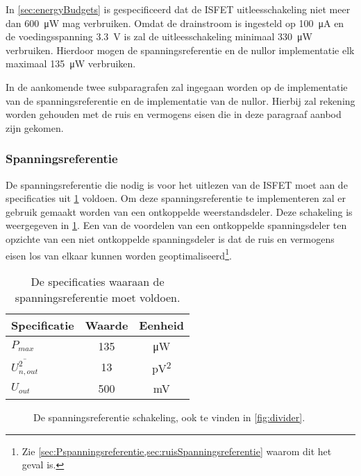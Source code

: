 In \cref{sec:energyBudgets} is gespecificeerd dat de ISFET uitleesschakeling niet meer dan \qty{600}{\micro\watt} mag verbruiken. Omdat de drainstroom is ingesteld op \qty{100}{\micro\ampere} en de voedingsspanning \qty{3.3}{\volt} is zal de uitleesschakeling minimaal \qty{330}{\micro\watt} verbruiken. Hierdoor mogen de spanningsreferentie en de nullor implementatie elk maximaal \qty{135}{\micro\watt} verbruiken.

In de aankomende twee subparagrafen zal ingegaan worden op de implementatie van de spanningsreferentie en de implementatie van de nullor. Hierbij zal rekening worden gehouden met de ruis en vermogens eisen die in deze paragraaf aanbod zijn gekomen.

\subsubsection{Spanningsreferentie}
De spanningsreferentie die nodig is voor het uitlezen van de ISFET moet aan de specificaties uit \cref{tab:specsSpanningsreferentie} voldoen. Om deze spanningsreferentie te implementeren zal er gebruik gemaakt worden van een ontkoppelde weerstandsdeler. Deze schakeling is weergegeven in \cref{fig:dividerForContext}. Een van de voordelen van een ontkoppelde spanningsdeler ten opzichte van een niet ontkoppelde spanningsdeler is dat de ruis en vermogens eisen los van elkaar kunnen worden geoptimaliseerd\footnote{Zie \cref{sec:Pspanningsreferentie,sec:ruisSpanningsreferentie} waarom dit het geval is.}.
\begin{table}[!htbp]
    \centering
    \begin{tabular}{l|c|c}
        Specificatie & Waarde & Eenheid  \\\hline
        $P_{max}$ & 135 & \si{\micro\watt}\\
        $\overline{U_{n,out}^2}$ & 13 & \si{\pico\volt^2}\\
        $U_{out}$ & 500 & \si{\milli\volt}\\
    \end{tabular}
    \caption{De specificaties waaraan de spanningsreferentie moet voldoen.}
    \label{tab:specsSpanningsreferentie}
\end{table}
\begin{figure}[!htbp]
    \centering
    \def\svgwidth{7cm}
    
    \caption{De spanningsreferentie schakeling, ook te vinden in \cref{fig:divider}.}
    \label{fig:dividerForContext}
\end{figure}

